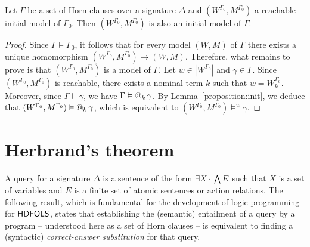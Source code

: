 \documentclass[a4paper,UKenglish,cleveref,autoref]{lipics-v2019}
\begin{document}
\begin{theorem} 
  \label{theorem:HDCLS-initiality}
  Let\/ \(\Gamma\) be a set of Horn clauses over a signature \(\Delta\) and \((W^{\Gamma_{0}}, M^{\Gamma_{0}})\) a reachable initial model of\/ \(\Gamma_{0}\).
  Then \((W^{\Gamma_{0}}, M^{\Gamma_{0}})\) is also an initial model of\/ \(\Gamma\).
\end{theorem}
\begin{proof}
  Since \(\Gamma \models \Gamma_{0}\), it follows that for every model \((W, M)\) of \(\Gamma\) there exists a unique homomorphism \((W^{\Gamma_{0}}, M^{\Gamma_{0}}) \to (W, M)\).
  Therefore, what remains to prove is that \((W^{\Gamma_{0}}, M^{\Gamma_{0}})\) is a model of \(\Gamma\).
  Let \(w \in |W^{\Gamma_{0}}|\) and \(\gamma \in \Gamma\).
  Since \((W^{\Gamma_{0}}, M^{\Gamma_{0}})\) is reachable, there exists a nominal term \(k\) such that \(w = W^{\Gamma_{0}}_{k}\).
  Moreover, since \(\Gamma \models \gamma\), we have \(\Gamma \vDash @_{k}\, \gamma\).
  By Lemma~\ref{proposition:init}, we deduce that \((W^{\Gamma_{0}}, M^{\Gamma_{0}}) \vDash @_{k}\, \gamma\), which is equivalent to \((W^{\Gamma_{0}}, M^{\Gamma_{0}}) \models^{w} \gamma\).
\end{proof}


\section{Herbrand's theorem}
\label{section:Herbrand-theorem}

A query for a signature \(\Delta\) is a sentence of the form \(\exists X\,{\cdot}\, \bigwedge E\) such that \(X\) is a set of variables and \(E\) is a finite set of atomic sentences or action relations.
The following result, which is fundamental for the development of logic programming for \({\mathsf{HDFOLS}}\), states that establishing the (semantic) entailment of a query by a program -- understood here as a set of Horn clauses -- is equivalent to finding a (syntactic) \emph{correct-answer substitution} for that query.
\end{document}
